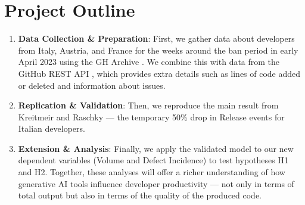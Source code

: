 \section*{Project Outline}



\begin{enumerate}
  \item \textbf{Data Collection \& Preparation}: First, we gather data about developers from Italy, Austria, and France for the weeks around the ban period in early April 2023 using the GH Archive \cite{github_archive}. We combine this with data from the GitHub REST API \cite{github_api}, which provides extra details such as lines of code added or deleted and information about issues.
  \item \textbf{Replication \& Validation}: Then, we reproduce the main result from Kreitmeir and Raschky — the temporary 50\% drop in Release events for Italian developers.
  \item \textbf{Extension \& Analysis}: Finally, we apply the validated model to our new dependent variables (Volume and Defect Incidence) to test hypotheses H1 and H2. Together, these analyses will offer a richer understanding of how generative AI tools influence developer productivity — not only in terms of total output but also in terms of the quality of the produced code.
\end{enumerate}
